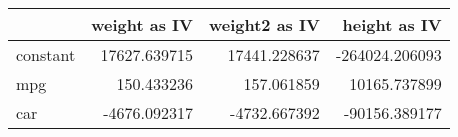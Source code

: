 \begin{tabular}{lrrr}
\toprule
{} &  weight as IV &  weight2 as IV &   height as IV \\
\midrule
constant &  17627.639715 &   17441.228637 & -264024.206093 \\
mpg      &    150.433236 &     157.061859 &   10165.737899 \\
car      &  -4676.092317 &   -4732.667392 &  -90156.389177 \\
\bottomrule
\end{tabular}
